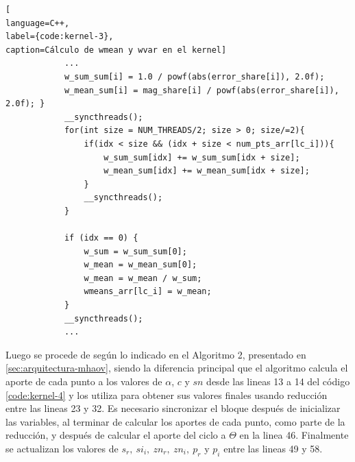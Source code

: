\begin{lstlisting}[
language=C++,
label={code:kernel-3},
caption=Cálculo de wmean y wvar en el kernel]
            ...
            w_sum_sum[i] = 1.0 / powf(abs(error_share[i]), 2.0f);
            w_mean_sum[i] = mag_share[i] / powf(abs(error_share[i]), 2.0f); }
            __syncthreads();
            for(int size = NUM_THREADS/2; size > 0; size/=2){
                if(idx < size && (idx + size < num_pts_arr[lc_i])){
                    w_sum_sum[idx] += w_sum_sum[idx + size];
                    w_mean_sum[idx] += w_mean_sum[idx + size];
                }
                __syncthreads();
            }

            if (idx == 0) {
                w_sum = w_sum_sum[0];
                w_mean = w_mean_sum[0];
                w_mean = w_mean / w_sum;
                wmeans_arr[lc_i] = w_mean;
            }
            __syncthreads();
            ...
\end{lstlisting}
Luego se procede de según lo indicado en el Algoritmo 2,  presentado en \ref{sec:arquitectura-mhaov}, siendo la diferencia principal que el algoritmo calcula el aporte de cada punto a los valores de $\alpha$, $c$ y $sn$ desde las lineas 13 a 14 del código \ref{code:kernel-4} y los utiliza para obtener sus valores finales usando reducción entre las lineas 23 y 32. Es necesario sincronizar el bloque después de inicializar las variables, al terminar de calcular los aportes de cada punto, como parte de la reducción, y después de calcular el aporte del ciclo a $\Theta$ en la linea 46. Finalmente se actualizan los valores de $s_r, \ si_i, \ zn_r, \ zn_i, \ p_r$ y $ p_i$ entre las lineas 49 y 58.
